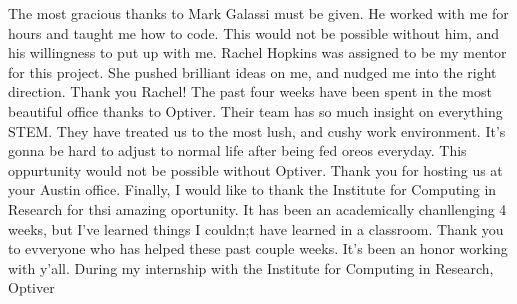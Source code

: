 \documentclass[a4paper,10pt]{article}
\newcounter{code}[section]
\begin{document}
The most gracious thanks to Mark Galassi must be given. He worked with me for hours and taught me how to code. This would not be possible without him, and his willingness to put up with me. Rachel Hopkins was assigned to be my mentor for this project. She pushed brilliant ideas on me, and nudged me into the right direction. Thank you Rachel! The past four weeks have been spent in the most beautiful office thanks to Optiver. Their team has so much insight on everything STEM. They have treated us to the most lush, and cushy work environment. It's gonna be hard to adjust to normal life after being fed oreos everyday. This oppurtunity would not be possible without Optiver. Thank you for hosting us at your Austin office. Finally, I would like to thank the Institute for Computing in Research for thsi amazing oportunity. It has been an academically chanllenging 4 weeks, but I've learned things I couldn;t have learned in a classroom. Thank you to evveryone who has helped these past couple weeks. It's been an honor working with y'all.
During my internship with the Institute for Computing in Research, Optiver 



 
\end{document}
